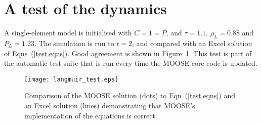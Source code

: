 \documentclass[]{scrreprt}
\begin{document}
\section{A test of the dynamics}

A single-element model is initialised with $C=1=P$, and $\tau=1.1$,
$\rho_{L}=0.88$ and $P_{L}=1.23$.  The simulation is run to $t=2$, and compared
with an Excel solution of Eqns~(\ref{test.eqns}).  Good agreement is
shown in Figure~\ref{langmuir_test.fig}.  This test is part of the
automatic test suite that is run every time the MOOSE core code is
updated.


\begin{figure}[htb]
\centering
\texttt{[image: langmuir\_test.eps]}
\caption{Comparison of the MOOSE solution (dots) to Eqn~(\ref{test.eqns}) and
  an Excel solution (lines) demonstrating that MOOSE's implementation of the
  equations is correct.}
\label{langmuir_test.fig}
\end{figure}
\end{document}
